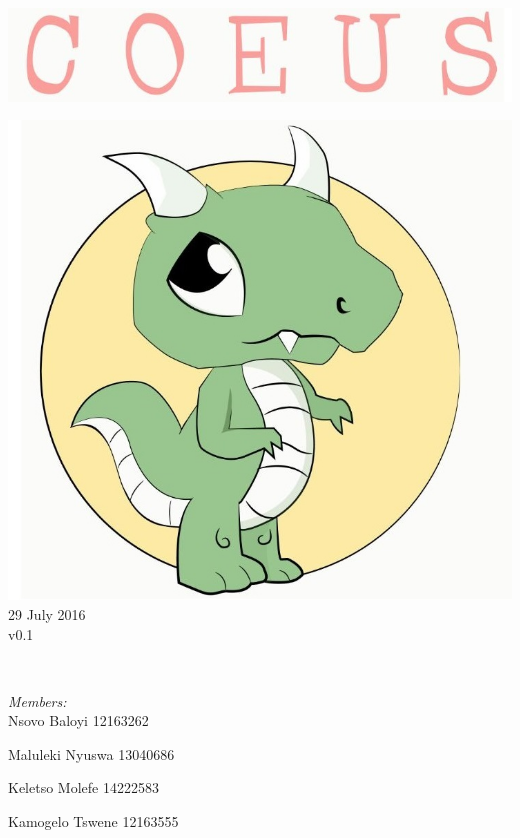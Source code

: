 \documentclass[a4paper,12pt]{article}
\begin{document}
\begin{titlepage}
	\includegraphics[width=\textwidth]{name} \\[1cm]
	\begin{minipage}{0.4\textwidth}
	\begin{flushleft} \large
	\includegraphics[width=\textwidth]{logo} \\[0.5cm]
	{\large 29 July 2016}\\
	{\large v0.1}
	\end{flushleft}
	\end{minipage}
	~
	\begin{minipage}{0.5\textwidth}
	\begin{flushright} \large
	\emph{Members:}\\%
	Nsovo Baloyi 12163262

	Maluleki Nyuswa 13040686
	
	Keletso Molefe 14222583
	
	Kamogelo Tswene 12163555

	\end{flushright}
	\end{minipage}\\[4cm]
\end{titlepage}
\end{document}
